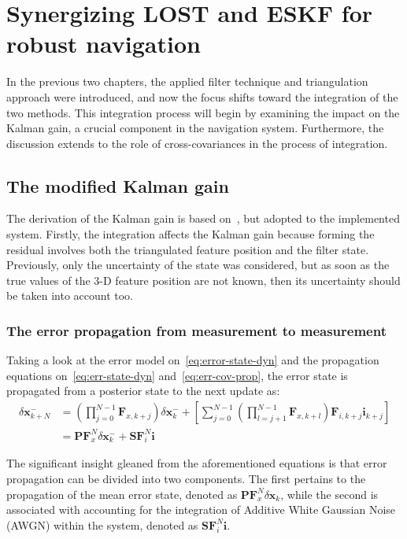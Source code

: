 \chapter{Synergizing LOST and ESKF for robust navigation}\label{chap:integration}

In the previous two chapters, the applied filter technique and triangulation approach were introduced, and now the focus shifts toward the integration of the two methods. This integration process will begin by examining the impact on the Kalman gain, a crucial component in the navigation system. Furthermore, the discussion extends to the role of cross-covariances in the process of integration.

\section{The modified Kalman gain}

The derivation of the Kalman gain is based on~\cite{discrete_kalman_tutorial}, but adopted to the implemented system. Firstly, the integration affects the Kalman gain because forming the residual involves both the triangulated feature position and the filter state. Previously, only the uncertainty of the state was considered, but as soon as the true values of the 3-D feature position are not known, then its uncertainty should be taken into account too.

\subsection{The error propagation from measurement to measurement}

Taking a look at the error model on~\eqref{eq:error-state-dyn} and the propagation equations on~\eqref{eq:err-state-dyn} and~\eqref{eq:err-cov-prop}, the error state is propagated from a posterior state to the next update as:
\begin{equation}
\begin{aligned}
    \delta\mathbf{x}_{k+N}^- &= \left(\prod_{j=0}^{N-1}\mathbf{F}_{x,k+j}\right)\delta\mathbf{x}_k^- + \left[\sum_{j=0}^{N-1}\left(\prod_{l=j+1}^{N-1}\mathbf{F}_{x,k+l} \right) \mathbf{F}_{i,k+j} \mathbf{i}_{k+j}\right] \\ &= \mathbf{PF}_x^N\delta\mathbf{x}_k^- + \mathbf{SF}_i^N \mathbf{i} 
 \label{eq:true-err-state}
\end{aligned}
\end{equation}

The significant insight gleaned from the aforementioned equations is that error propagation can be divided into two components. The first pertains to the propagation of the mean error state, denoted as $\mathbf{PF}_x^N\delta\mathbf{x}_k$, while the second is associated with accounting for the integration of Additive White Gaussian Noise (AWGN) within the system, denoted as $\mathbf{SF}_i^N \mathbf{i}$.

